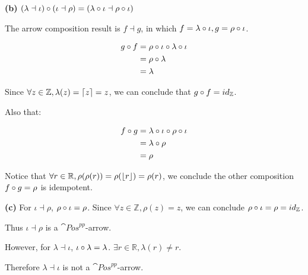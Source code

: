 \documentclass[11pt]{article}
\DeclarePairedDelimiter\ceil{\lceil}{\rceil}
\DeclarePairedDelimiter\floor{\lfloor}{\rfloor}
\begin{document}
\textbf{(b)} $(\lambda \dashv \iota) \circ (\iota \dashv \rho) = (\lambda \circ \iota \dashv \rho \circ \iota)$

The arrow composition result is $f \dashv g$, in which $f = \lambda \circ \iota, g = \rho \circ \iota$.

\begin{align*}
g \circ f & = \rho \circ \iota \circ \lambda \circ \iota \\
           & = \rho \circ \lambda \\
           & = \lambda
\end{align*}

Since $\forall z \in \mathbb{Z}, \lambda(z) = \ceil{z} = z$, we can conclude that $g \circ f = id_\mathbb{Z}$.

Also that:

\begin{align*}
f \circ g & = \lambda \circ \iota \circ \rho \circ \iota \\
	       & = \lambda \circ \rho \\
	       & = \rho
\end{align*}

Notice that $\forall r \in \mathbb{R}, \rho(\rho(r)) = \rho(\floor{r}) = \rho(r)$,
we conclude the other composition $f \circ g = \rho$ is idempotent.

\textbf{(c)} For $\iota \dashv \rho$, $\rho \circ \iota = \rho$.
Since $\forall z \in \mathbb{Z}, \rho(z) = z$, we can conclude $\rho \circ \iota = \rho = id_\mathbb{Z}$.

Thus $\iota \dashv \rho$ is a $\cat{Pos}^{pp}$-arrow.

However, for $\lambda \dashv \iota$, $\iota \circ \lambda = \lambda$. $\exists r \in \mathbb{R}, \lambda(r) \neq r$.

Therefore $\lambda \dashv \iota$ is not a $\cat{Pos}^{pp}$-arrow.
\end{document}
